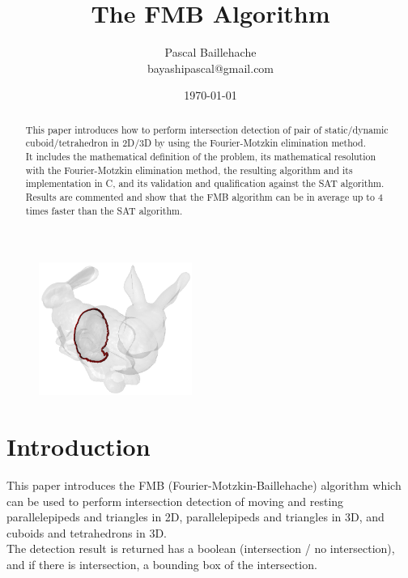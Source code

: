 \documentclass[12pt, a4paper]{article}
\begin{document}
\title{The FMB Algorithm}
\author{Pascal Baillehache\\bayashipascal@gmail.com}
\date{\today}
\maketitle
\begin{center}
\begin{figure}[H]
\centering\includegraphics[width=5cm]{./bunny.png}\\
\end{figure}
\end{center}
\thispagestyle{empty}

\begin{abstract}
This paper introduces how to perform intersection detection of pair of static/dynamic cuboid/tetrahedron in 2D/3D by using the Fourier-Motzkin elimination method.\\
It includes the mathematical definition of the problem, its mathematical resolution with the Fourier-Motzkin elimination method, the resulting algorithm and its implementation in C, and its validation and qualification against the SAT algorithm. Results are commented and show that the FMB algorithm can be in average up to 4 times faster than the SAT algorithm.
\end{abstract}

\newpage
\tableofcontents

\section*{Introduction}

This paper introduces the FMB (Fourier-Motzkin-Baillehache) algorithm which can be used to perform intersection detection of moving and resting parallelepipeds and triangles in 2D, parallelepipeds and triangles in 3D, and cuboids and tetrahedrons in 3D.\\

The detection result is returned has a boolean (intersection / no intersection), and if there is intersection, a bounding box of the intersection.\\
\end{document}
